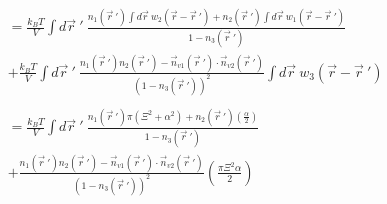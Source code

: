 \documentclass[double,12pt]{revtex4-2}
\begin{document}
\begin{align} %
          &= \frac{k_BT}{V} \int d\vec r~'~ \frac{n_1(\vec r~')\int d \vec r
           ~w_2(\vec r - \vec r~')
          +n_2(\vec r~')\int d \vec r ~w_1(\vec r - \vec r~')}
          {1-n_3(\vec r~')} \nonumber\\
          &+\frac{k_BT}{V} \int d\vec r~'~\frac{n_1(\vec r~')n_2(\vec r~')
          -\vec n_{v1}(\vec r~')
          \cdot \vec n_{v2}(\vec r~')}{(1-n_3(\vec r~'))^2} \int d \vec r 
          ~w_3(\vec r - \vec r~') \\ \nonumber \\
%
           &= \frac{k_BT}{V}\int d\vec r~'~ \frac{n_1(\vec r~')
           \pi(\Xi^2 + \alpha^2)
          +n_2(\vec r~')\left(\frac{\alpha}{2}\right)}{1-n_3(\vec r~')} 
          \nonumber \\
          &+ \frac{n_1(\vec r~')n_2(\vec r~')
          -\vec n_{v1}(\vec r~')
          \cdot \vec n_{v2}(\vec r~')}{(1-n_3(\vec r~'))^2}
          \left(\frac{\pi\Xi^2\alpha}{2}\right)   
\end{align}
\end{document}
